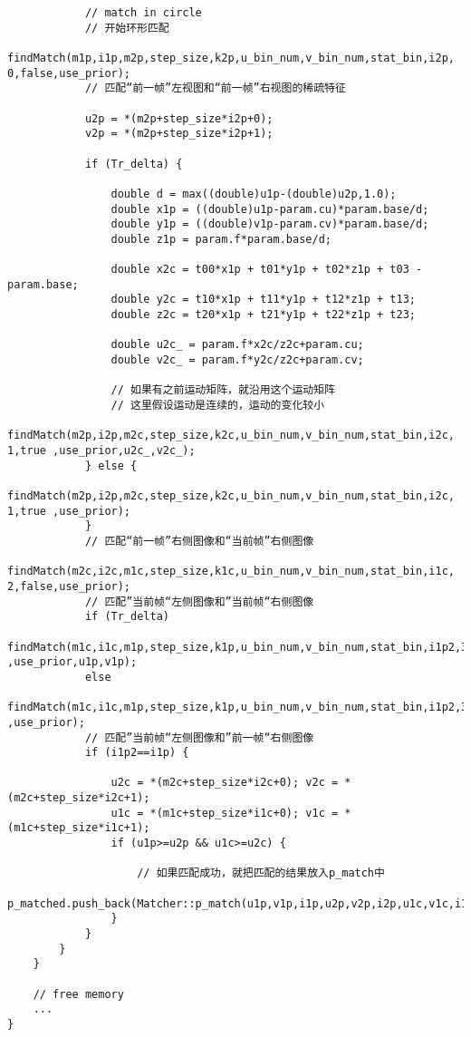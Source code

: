 \documentclass[UTF8]{ctexart}
\begin{document}
\begin{verbatim}
            // match in circle
            // 开始环形匹配
            findMatch(m1p,i1p,m2p,step_size,k2p,u_bin_num,v_bin_num,stat_bin,i2p, 0,false,use_prior);
            // 匹配“前一帧”左视图和“前一帧”右视图的稀疏特征

            u2p = *(m2p+step_size*i2p+0);
            v2p = *(m2p+step_size*i2p+1);

            if (Tr_delta) {
            
                double d = max((double)u1p-(double)u2p,1.0);
                double x1p = ((double)u1p-param.cu)*param.base/d;
                double y1p = ((double)v1p-param.cv)*param.base/d;
                double z1p = param.f*param.base/d;

                double x2c = t00*x1p + t01*y1p + t02*z1p + t03 - param.base;
                double y2c = t10*x1p + t11*y1p + t12*z1p + t13;
                double z2c = t20*x1p + t21*y1p + t22*z1p + t23;

                double u2c_ = param.f*x2c/z2c+param.cu;
                double v2c_ = param.f*y2c/z2c+param.cv;

                // 如果有之前运动矩阵，就沿用这个运动矩阵
                // 这里假设运动是连续的，运动的变化较小
                findMatch(m2p,i2p,m2c,step_size,k2c,u_bin_num,v_bin_num,stat_bin,i2c, 1,true ,use_prior,u2c_,v2c_);
            } else {
                findMatch(m2p,i2p,m2c,step_size,k2c,u_bin_num,v_bin_num,stat_bin,i2c, 1,true ,use_prior);
            }
            // 匹配“前一帧”右侧图像和“当前帧”右侧图像
            findMatch(m2c,i2c,m1c,step_size,k1c,u_bin_num,v_bin_num,stat_bin,i1c, 2,false,use_prior);
            // 匹配”当前帧“左侧图像和”当前帧“右侧图像
            if (Tr_delta)
                findMatch(m1c,i1c,m1p,step_size,k1p,u_bin_num,v_bin_num,stat_bin,i1p2,3,true ,use_prior,u1p,v1p);
            else
                findMatch(m1c,i1c,m1p,step_size,k1p,u_bin_num,v_bin_num,stat_bin,i1p2,3,true ,use_prior);
            // 匹配”当前帧“左侧图像和”前一帧“右侧图像
            if (i1p2==i1p) {

                u2c = *(m2c+step_size*i2c+0); v2c = *(m2c+step_size*i2c+1);
                u1c = *(m1c+step_size*i1c+0); v1c = *(m1c+step_size*i1c+1);
                if (u1p>=u2p && u1c>=u2c) {
                
                    // 如果匹配成功，就把匹配的结果放入p_match中
                    p_matched.push_back(Matcher::p_match(u1p,v1p,i1p,u2p,v2p,i2p,u1c,v1c,i1c,u2c,v2c,i2c));
                }
            }
        }
    }

    // free memory
    ...
}
    \end{verbatim}
\end{document}
